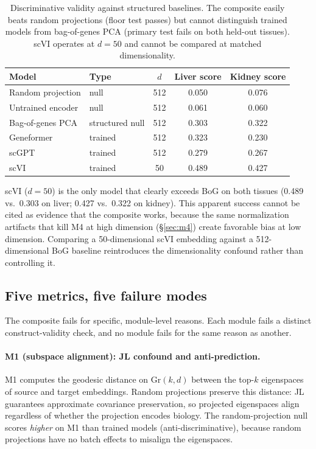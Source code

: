 \documentclass[9pt,lineno]{elife}
\newcommand{\Gr}{\mathrm{Gr}}
\begin{document}
\begin{table}[t]
\centering
\caption{Discriminative validity against structured baselines. The composite easily beats random projections (floor test passes) but cannot distinguish trained models from bag-of-genes PCA (primary test fails on both held-out tissues). scVI operates at $d = 50$ and cannot be compared at matched dimensionality.}
\label{tab:v6b}
\small
\begin{tabular}{@{}llccc@{}}
\toprule
Model & Type & $d$ & Liver score & Kidney score \\
\midrule
Random projection & null & 512 & 0.050 & 0.076 \\
Untrained encoder & null & 512 & 0.061 & 0.060 \\
\midrule
Bag-of-genes PCA & structured null & 512 & 0.303 & 0.322 \\
\midrule
Geneformer & trained & 512 & 0.323 & 0.230 \\
scGPT & trained & 512 & 0.279 & 0.267 \\
scVI & trained & 50 & 0.489 & 0.427 \\
\bottomrule
\end{tabular}
\end{table}

scVI ($d = 50$) is the only model that clearly exceeds BoG on both tissues (0.489 vs.\ 0.303 on liver; 0.427 vs.\ 0.322 on kidney). This apparent success cannot be cited as evidence that the composite works, because the same normalization artifacts that kill M4 at high dimension (\S\ref{sec:m4}) create favorable bias at low dimension. Comparing a 50-dimensional scVI embedding against a 512-dimensional BoG baseline reintroduces the dimensionality confound rather than controlling it.

\subsection{Five metrics, five failure modes}
\label{sec:five_failures}

The composite fails for specific, module-level reasons. Each module fails a distinct construct-validity check, and no module fails for the same reason as another.

\paragraph{M1 (subspace alignment): JL confound and anti-prediction.}

M1 computes the geodesic distance on $\Gr(k, d)$ between the top-$k$ eigenspaces of source and target embeddings. Random projections preserve this distance: JL guarantees approximate covariance preservation, so projected eigenspaces align regardless of whether the projection encodes biology. The random-projection null scores \emph{higher} on M1 than trained models (anti-discriminative), because random projections have no batch effects to misalign the eigenspaces.
\end{document}
